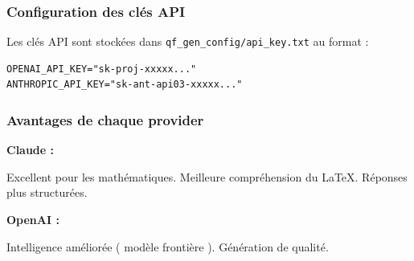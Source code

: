 \subsubsection{Configuration des clés API}

Les clés API sont stockées dans \texttt{qf\_gen\_config/api\_key.txt} au format :

\begin{lstlisting}
OPENAI_API_KEY="sk-proj-xxxxx..."
ANTHROPIC_API_KEY="sk-ant-api03-xxxxx..."
\end{lstlisting}


\subsubsection{Avantages de chaque provider}

\textbf{Claude :}
\begin{tcbenumerate}
    \tcbitem Excellent pour les mathématiques.
    \tcbitem Meilleure compréhension du LaTeX.
    \tcbitem Réponses plus structurées.
\end{tcbenumerate}

\textbf{OpenAI :}
\begin{tcbenumerate}
    \tcbitem Intelligence améliorée ( modèle frontière ).
    \tcbitem Génération de qualité.
\end{tcbenumerate} 